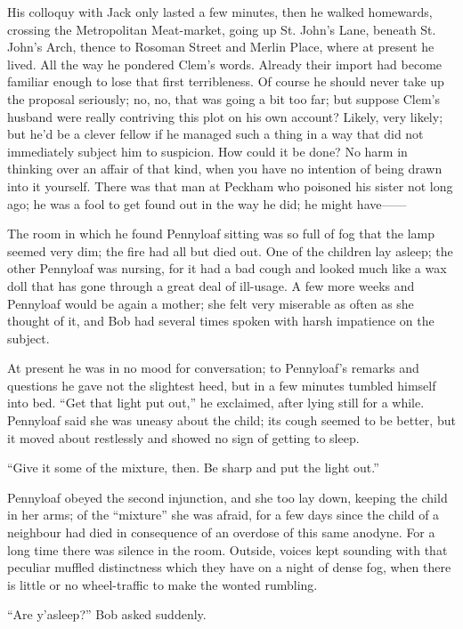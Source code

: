 His colloquy with Jack only lasted a few minutes, then he walked
homewards, crossing the Metropolitan Meat-market, going up St. John's
Lane, beneath St. John's Arch, thence to Rosoman Street and Merlin
Place, where at present he lived. All the way he pondered Clem's words.
Already their import had become {}familiar enough to lose that first
terribleness. Of course he should never take up the proposal seriously;
no, no, that was going a bit too far; but suppose Clem's husband were
really contriving this plot on his own account? Likely, very likely; but
he'd be a clever fellow if he managed such a thing in a way that did not
immediately subject him to suspicion. How could it be done? No harm in
thinking over an affair of that kind, when you have no intention of
being drawn into it yourself. There was that man at Peckham who poisoned
his sister not long ago; he was a fool to get found out in the way he
did; he might {have{{------}}}

The room in which he found Pennyloaf sitting was so full of fog that the
lamp seemed very dim; the fire had all but died out. One of the children
lay asleep; the other Pennyloaf was nursing, for it had a bad cough and
looked much like a wax doll that has gone through a great deal of
ill-usage. A few more weeks and Pennyloaf would be again a mother; she
felt very miserable as often as she thought of it, and Bob had several
times spoken with harsh impatience on the subject.

At present he was in no mood for {}conversation; to Pennyloaf's remarks
and questions he gave not the slightest heed, but in a few minutes
tumbled himself into bed. ``Get that light put out,'' he exclaimed,
after lying still for a while. Pennyloaf said she was uneasy about the
child; its cough seemed to be better, but it moved about restlessly and
showed no sign of getting to sleep.

``Give it some of the mixture, then. Be sharp and put the light out.''

Pennyloaf obeyed the second injunction, and she too lay down, keeping
the child in her arms; of the ``mixture'' she was afraid, for a few days
since the child of a neighbour had died in consequence of an overdose of
this same anodyne. For a long time there was silence in the room.
Outside, voices kept sounding with that peculiar muffled distinctness
which they have on a night of dense fog, when there is little or no
wheel-traffic to make the wonted rumbling.

``Are y'asleep?'' Bob asked suddenly.

